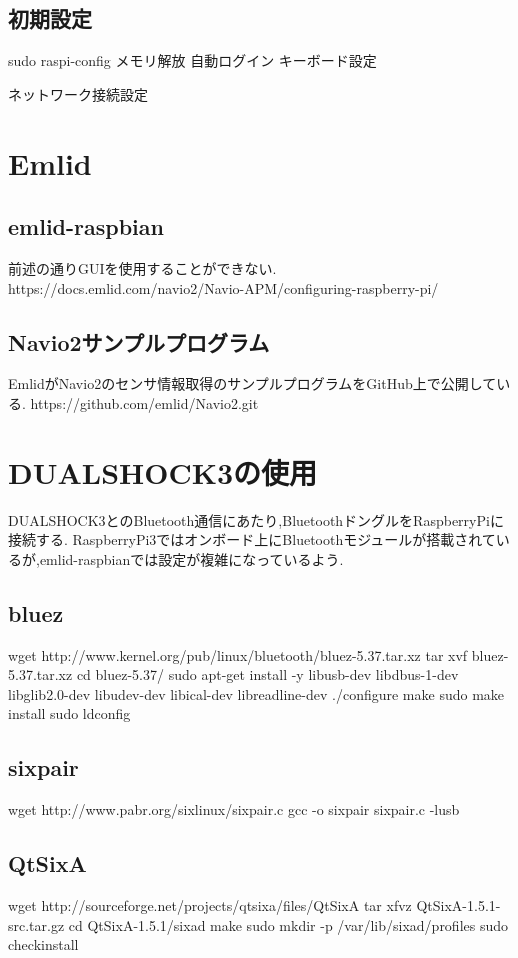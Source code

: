 \documentclass[12pt,oneside]{sotsuken_paper}
\begin{document}
\subsection{初期設定}
sudo raspi-config
メモリ解放
自動ログイン
キーボード設定

ネットワーク接続設定

\section{Emlid}

\subsection{emlid-raspbian}
前述の通りGUIを使用することができない.
https://docs.emlid.com/navio2/Navio-APM/configuring-raspberry-pi/

\subsection{Navio2サンプルプログラム}
EmlidがNavio2のセンサ情報取得のサンプルプログラムをGitHub上で公開している.
https://github.com/emlid/Navio2.git

\section{DUALSHOCK3の使用}
DUALSHOCK3とのBluetooth通信にあたり,BluetoothドングルをRaspberryPiに接続する.
RaspberryPi3ではオンボード上にBluetoothモジュールが搭載されているが,emlid-raspbianでは設定が複雑になっているよう.

\subsection{bluez}
wget http://www.kernel.org/pub/linux/bluetooth/bluez-5.37.tar.xz
tar xvf bluez-5.37.tar.xz
cd bluez-5.37/
sudo apt-get install -y libusb-dev libdbus-1-dev libglib2.0-dev libudev-dev libical-dev libreadline-dev
./configure
make
sudo make install
sudo ldconfig

\subsection{sixpair}
wget http://www.pabr.org/sixlinux/sixpair.c
gcc -o sixpair sixpair.c -lusb

\subsection{QtSixA}
wget http://sourceforge.net/projects/qtsixa/files/QtSixA%
tar xfvz QtSixA-1.5.1-src.tar.gz
cd QtSixA-1.5.1/sixad
make
sudo mkdir -p /var/lib/sixad/profiles
sudo checkinstall
\end{document}
